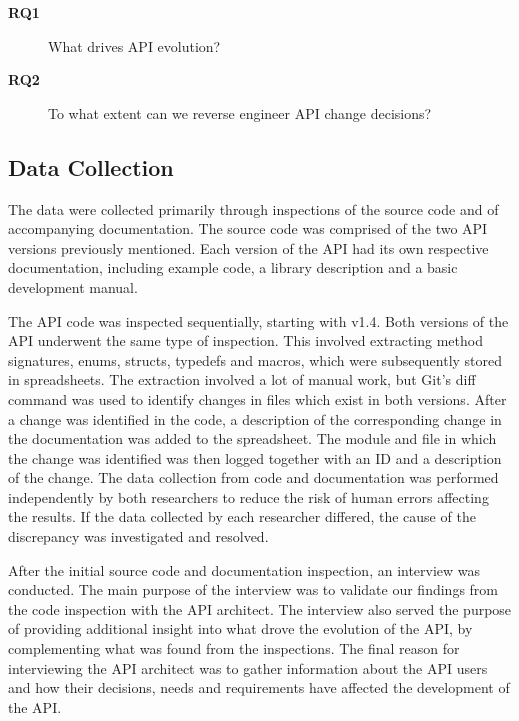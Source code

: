 \documentclass{sig-alternate}
\begin{document}
\begin{description}
\item[\textbf{RQ1}] What drives API evolution?
\item[\textbf{RQ2}] To what extent can we reverse engineer API change decisions?
\end{description}

\newpage


\subsection{Data Collection} \label{data_collection}  
The data were collected primarily through inspections of the source code and of accompanying documentation. The source code was comprised of the two API versions previously mentioned. Each version of the API had its own respective documentation, including example code, a library description and a basic development manual. 

The API code was inspected sequentially, starting with v1.4. Both versions of the API underwent the same type of inspection. This involved extracting method signatures, enums, structs, typedefs and macros, which were subsequently stored in spreadsheets. The extraction involved a lot of manual work, but Git's \cite{git} diff command was used to identify changes in files which exist in both versions. After a change was identified in the code, a description of the corresponding change in the documentation was added to the spreadsheet. The module and file in which the change was identified was then logged together with an ID and a description of the change. The data collection from code and documentation was performed independently by both researchers to reduce the risk of human errors affecting the results. If the data collected by each researcher differed, the cause of the discrepancy was investigated and resolved. 

After the initial source code and documentation inspection, an interview was conducted. The main purpose of the interview was to validate our findings from the code inspection with the API architect. The interview also served the purpose of providing additional insight into what drove the evolution of the API, by complementing what was found from the inspections. The final reason for interviewing the API architect was to gather information about the API users and how their decisions, needs and requirements have affected the development of the API. 
\end{document}
